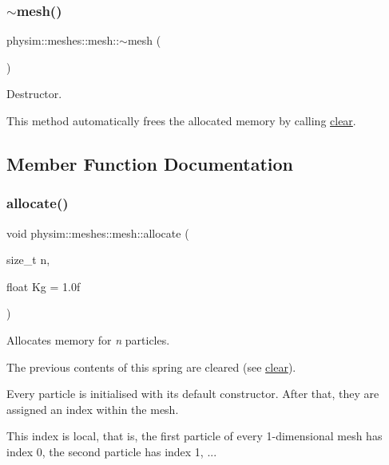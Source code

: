 \subsubsection{\texorpdfstring{$\sim$mesh()}{~mesh()}}
{\footnotesize\ttfamily physim\+::meshes\+::mesh\+::$\sim$mesh (\begin{DoxyParamCaption}{ }\end{DoxyParamCaption})\hspace{0.3cm}{\ttfamily [virtual]}}



Destructor. 

This method automatically frees the allocated memory by calling \hyperlink{classphysim_1_1meshes_1_1mesh_ae2923846bfeec345fae4876181960c03}{clear}. 

\subsection{Member Function Documentation}
\mbox{\label{classphysim_1_1meshes_1_1mesh_a09dcfcda6da092c7acae3f961fde4b32}} 
\subsubsection{\texorpdfstring{allocate()}{allocate()}}
{\footnotesize\ttfamily void physim\+::meshes\+::mesh\+::allocate (\begin{DoxyParamCaption}\item[{size\+\_\+t}]{n,  }\item[{float}]{Kg = {\ttfamily 1.0f} }\end{DoxyParamCaption})}



Allocates memory for {\itshape n} particles. 

The previous contents of this spring are cleared (see \hyperlink{classphysim_1_1meshes_1_1mesh_ae2923846bfeec345fae4876181960c03}{clear}).

Every particle is initialised with its default constructor. After that, they are assigned an index within the mesh.

This index is local, that is, the first particle of every 1-\/dimensional mesh has index 0, the second particle has index 1, ...

